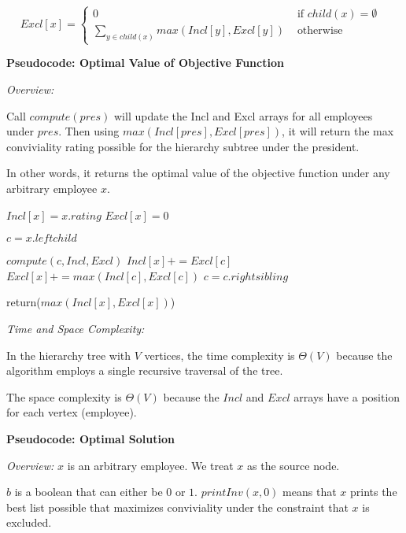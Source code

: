 \documentclass[a4paper]{report}
\begin{document}
\begin{enumerate}
      \begin{displaymath}
      Excl[x] = \left\{
        \begin{array}{lr}
          0 & \text{ if $child(x) = \emptyset$ }\\
          \sum_{y \in child(x)} max( Incl[y], Excl[y])   & \text{ otherwise }
        \end{array}
        \right.
      \end{displaymath} 


      {\bf Pseudocode: Optimal Value of Objective Function}

      {\it Overview:}

      Call $compute(pres)$ will update the Incl and Excl arrays for all employees under $pres$. 
      Then using $max(Incl[pres], Excl[pres])$, it will return the max conviviality rating possible for the hierarchy subtree under the president.

      In other words, it returns the optimal value of the objective function under any arbitrary employee $x$.

      \begin{algorithmic}[1]
          \State $Incl[x] = x.rating$
          \State $Excl[x] = 0$

          \State $c = x.leftchild$

            \State $compute(c, Incl, Excl)$
            \State $Incl[x] += Excl[c]$
            \State $Excl[x] += max(Incl[c], Excl[c])$
            \State $c = c.rightsibling$
          \EndWhile

          \State return($max(Incl[x], Excl[x])$)
        \EndFunction
      \end{algorithmic}

      {\it Time and Space Complexity:}

      In the hierarchy tree with $V$ vertices, the time complexity is $\Theta(V)$ because the algorithm employs
      a single recursive traversal of the tree. 

      The space complexity is $\Theta(V)$ because the $Incl$ and $Excl$ arrays have a position for each vertex (employee).


      {\bf Pseudocode: Optimal Solution}

      {\it Overview:}
      $x$ is an arbitrary employee. We treat $x$ as the source node. 

      $b$ is a boolean that can either be $0$ or $1$. $printInv(x, 0)$ means that $x$ prints
      the best list possible that maximizes conviviality under the constraint that $x$ is excluded. 
      

\end{enumerate}
\end{document}
